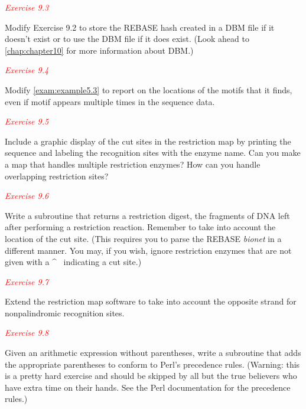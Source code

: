 \textcolor{red}{\textit{Exercise 9.3}}
\begin{adjustwidth}{1cm}{}
Modify Exercise 9.2 to store the REBASE hash created in a DBM file if it doesn't exist or to use the DBM file if it does exist. (Look ahead to \autoref{chap:chapter10} for more information about DBM.) 
\end{adjustwidth}

\textcolor{red}{\textit{Exercise 9.4}}
\begin{adjustwidth}{1cm}{}
Modify \autoref{exam:example5.3} to report on the locations of the motifs that it finds, even if motif appears multiple times in the sequence data. 
\end{adjustwidth}

\textcolor{red}{\textit{Exercise 9.5}}
\begin{adjustwidth}{1cm}{}
Include a graphic display of the cut sites in the restriction map by printing the sequence and labeling the recognition sites with the enzyme name. Can you make a map that handles multiple restriction enzymes? How can you handle overlapping restriction sites? 
\end{adjustwidth}

\textcolor{red}{\textit{Exercise 9.6}}
\begin{adjustwidth}{1cm}{}
Write a subroutine that returns a restriction digest, the fragments of DNA left after performing a restriction reaction. Remember to take into account the location of the cut site. (This requires you to parse the REBASE \textit{bionet} in a different manner. You may, if you wish, ignore restriction enzymes that are not given with a \^~ indicating a cut site.) 
\end{adjustwidth}


\textcolor{red}{\textit{Exercise 9.7}}
\begin{adjustwidth}{1cm}{}
Extend the restriction map software to take into account the opposite strand for nonpalindromic recognition sites. 
\end{adjustwidth}

\textcolor{red}{\textit{Exercise 9.8}}
\begin{adjustwidth}{1cm}{}
Given an arithmetic expression without parentheses, write a subroutine that adds the appropriate parentheses to conform to Perl's precedence rules. (Warning: this is a pretty hard exercise and should be skipped by all but the true believers who have extra time on their hands. See the Perl documentation for the precedence rules.) 
\end{adjustwidth}

